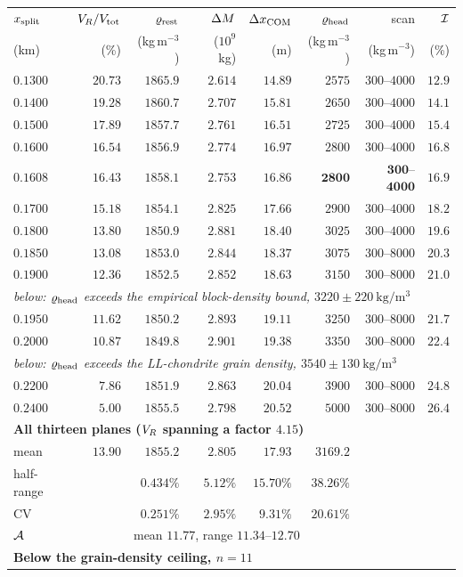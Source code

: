 \begin{table}[htbp]
\label{tab:itokawasweep}
\setlength{\tabcolsep}{10pt}
\begin{tabular}{lrrrrrrr}
\toprule
$x_{\mathrm{split}}$ & $V_{R}/V_{\mathrm{tot}}$ & $\varrho_{\mathrm{rest}}$ & $\Delta M$ & $\Delta x_{\mathrm{COM}}$
 & $\denshead$ & scan & $\mathcal{I}$ \\
(km) & (\%) & (kg\,m$^{-3}$) & ($10^{9}$~kg) & (m)
 & (kg\,m$^{-3}$) & (kg\,m$^{-3}$) & (\%) \\
\midrule
$0.1300$ & $20.73$ & $1865.9$ & $2.614$ & $14.89$ & $2575$ & $300$--$4000$ & $12.9$ \\
$0.1400$ & $19.28$ & $1860.7$ & $2.707$ & $15.81$ & $2650$ & $300$--$4000$ & $14.1$ \\
$0.1500$ & $17.89$ & $1857.7$ & $2.761$ & $16.51$ & $2725$ & $300$--$4000$ & $15.4$ \\
$0.1600$ & $16.54$ & $1856.9$ & $2.774$ & $16.97$ & $2800$ & $300$--$4000$ & $16.8$ \\
$\mathbf{0.1608}$ & $\mathbf{16.43}$ & $\mathbf{1858.1}$ & $\mathbf{2.753}$
 & $\mathbf{16.86}$ & $\mathbf{2800}$ & $\mathbf{300}$--$\mathbf{4000}$ & $\mathbf{16.9}$ \\
$0.1700$ & $15.18$ & $1854.1$ & $2.825$ & $17.66$ & $2900$ & $300$--$4000$ & $18.2$ \\
$0.1800$ & $13.80$ & $1850.9$ & $2.881$ & $18.40$ & $3025$ & $300$--$4000$ & $19.6$ \\
$0.1850$ & $13.08$ & $1853.0$ & $2.844$ & $18.37$ & $3075$ & $300$--$8000$ & $20.3$ \\
$0.1900$ & $12.36$ & $1852.5$ & $2.852$ & $18.63$ & $3150$ & $300$--$8000$ & $21.0$ \\
\cmidrule(l){1-8}
\multicolumn{8}{l}{\footnotesize\itshape
 below: $\denshead$ exceeds the empirical block-density bound,
 $3220 \pm \SI{220}{\kilo\gram\per\cubic\metre}$} \\
$0.1950$ & $11.62$ & $1850.2$ & $2.893$ & $19.11$ & $3250$ & $300$--$8000$ & $21.7$ \\
$0.2000$ & $10.87$ & $1849.8$ & $2.901$ & $19.38$ & $3350$ & $300$--$8000$ & $22.4$ \\
\cmidrule(l){1-8}
\multicolumn{8}{l}{\footnotesize\itshape
 below: $\denshead$ exceeds the LL-chondrite grain density,
 $3540 \pm \SI{130}{\kilo\gram\per\cubic\metre}$} \\
$0.2200$ & $7.86$ & $1851.9$ & $2.863$ & $20.04$ & $3900$ & $300$--$8000$ & $24.8$ \\
$0.2400$ & $5.00$ & $1855.5$ & $2.798$ & $20.52$ & $5000$ & $300$--$8000$ & $26.4$ \\
\midrule
\multicolumn{8}{l}{\bfseries All thirteen planes\quad
 ($V_{R}$ spanning a factor $4.15$)} \\
mean       & $13.90$ & $1855.2$ & $2.805$ & $17.93$ & $3169.2$ & & \\
half-range &         & $0.434\%$ & $5.12\%$ & $15.70\%$ & $38.26\%$ & & \\
CV         &         & $\mathbf{0.251\%}$ & $\mathbf{2.95\%}$
           & $\mathbf{9.31\%}$ & $20.61\%$ & & \\
$\mathcal{A}$  &         & \multicolumn{6}{l}{mean $11.77$, range $11.34$--$12.70$} \\
\midrule
\multicolumn{8}{l}{\bfseries Below the grain-density ceiling, $n=11$\quad 

}
\end{tabular}
\end{table}
